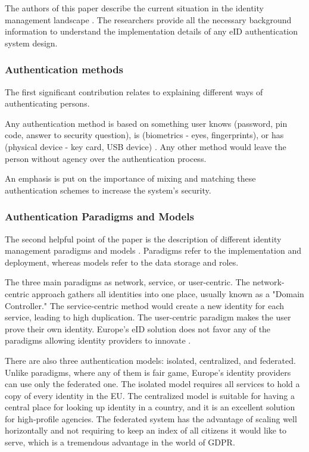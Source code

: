 The authors of this paper describe the current situation in the identity management landscape \cite{federated-europe-identity}. The researchers provide all the necessary background information to understand the implementation details of any eID authentication system design.

\subsubsection{Authentication methods}

The first significant contribution relates to explaining different ways of authenticating persons.

Any authentication method is based on something user knows (password, pin code, answer to security question), is (biometrics - eyes, fingerprints), or has (physical device - key card, USB device) \cite{o2003comparing}. Any other method would leave the person without agency over the authentication process. 

An emphasis is put on the importance of mixing and matching these authentication schemes to increase the system's security.

\subsubsection{Authentication Paradigms and Models}

The second helpful point of the paper is the description of different identity management paradigms and models \cite{identity-paradigms}. Paradigms refer to the implementation and deployment, whereas models refer to the data storage and roles.

The three main paradigms as network, service, or user-centric. The network-centric approach gathers all identities into one place, usually known as a "Domain Controller." The service-centric method would create a new identity for each service, leading to high duplication. The user-centric paradigm makes the user prove their own identity. Europe's eID solution does not favor any of the paradigms allowing identity providers to innovate \cite{eelaw-idcard,eeid,dokobit}.

There are also three authentication models: isolated, centralized, and federated. Unlike paradigms, where any of them is fair game, Europe's identity providers can use only the federated one. The isolated model requires all services to hold a copy of every identity in the EU. The centralized model is suitable for having a central place for looking up identity in a country, and it is an excellent solution for high-profile agencies. The federated system has the advantage of scaling well horizontally and not requiring to keep an index of all citizens it would like to serve, which is a tremendous advantage in the world of GDPR.

